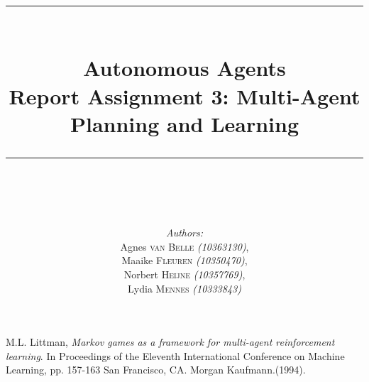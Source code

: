 \documentclass{article}
\newcommand{\HRule}{\rule{\linewidth}{0.1mm}}
\begin{document}
\title{ \HRule \\[0.2cm]
		Autonomous Agents\\ 
		Report Assignment 3: Multi-Agent Planning and Learning\\
		\HRule \\[0.1cm]
		}
		
\author{
		\emph{Authors:}\\[0.2cm]
		Agnes \textsc{van Belle} \small{ \emph{(10363130)}},\\ 
		Maaike \textsc{Fleuren} \small{ \emph{(10350470)}}, \\
		Norbert \textsc{Heijne} \small{ \emph{(10357769)}}, \\
		Lydia \textsc{Mennes} \small{ \emph{(10333843)}}
		}
		
\maketitle







\newpage
\nocite{*}


\begin{thebibliography}{9}
  M.L. Littman,
  \emph{Markov games as a framework for multi-agent reinforcement learning}. In Proceedings of the Eleventh International Conference on Machine Learning, pp. 157-163 San Francisco, CA. Morgan Kaufmann.(1994).
\end{thebibliography}
\end{document}

